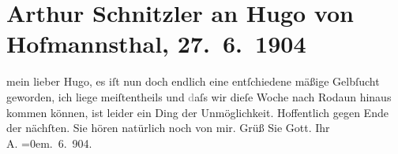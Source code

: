 

         
         \renewcommand{\erwaehntePersonen}{Personen: Hugo von Hofmannsthal}
         \renewcommand{\erwaehnteOrte}{Orte: Rodaun, Wien}
         \renewcommand{\erwaehnteWerke}{}
               \section[Arthur Schnitzler an Hugo von Hofmannsthal, 27. 6. 1904]{ Arthur Schnitzler an Hugo von Hofmannsthal, 27. 6. 1904}\nopagebreak{}\rehead{ }\begin{ledgroupsized}[t]{13cm}\normalsize\beginnumbering \toendnotes[C]{\smallbreak\pagebreak[2]} 
\pstart
           \noindent{}{\pb}mein lieber Hugo, es iſt nun doch endlich eine entſchiedene mäßige
               Gelbſucht geworden, ich liege meiſtentheils und \textcolor{gray}{d}aſs wir dieſe
               Woche nach Rodaun hinaus kommen können, ist leider
               ein Ding der Unmöglichkeit. Hoffentlich gegen Ende der nächſten.\pend
           \pstart
           Sie hören natürlich noch {\pb}von mir. Grüß Sie Gott.\pend
           \pstart
           Ihr{\\[\baselineskip]}\spacefill\mbox{A.}\pend
           \leftskip=0em{}. 6. 904.\pend
           
         
         \endnumbering{}\end{ledgroupsized}  \newcommand{\dateiname}{L01410}\newcommand{\titel}{Arthur Schnitzler an Hugo von Hofmannsthal, 27. 6. 1904}\newcommand{\editorInnen}{Martin Anton Müller und Gerd-Hermann Susen}
      